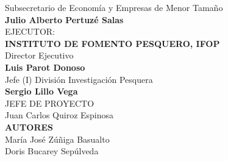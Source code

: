 \documentclass[12pt, oneside]{article} %
\begin{document}
\begin{titlepage}
\begin{minipage}{\textwidth}
\begin{flushright}
 \vspace*{5mm} 
  Subsecretario de Economía y Empresas de Menor Tamaño\\
 \textbf{Julio Alberto Pertuzé Salas} \\
 \vspace*{5mm} 
 EJECUTOR: \\ 
 \textbf{INSTITUTO DE FOMENTO PESQUERO, IFOP}\\
 \vspace*{4mm} 
 Director Ejecutivo   
 \\ \textbf{Luis Parot Donoso} \\
 \vspace*{4mm} 
 Jefe (I) División Investigación Pesquera   
 \\ \textbf{Sergio Lillo Vega} \\
 \vspace*{8mm} 
 \fontsize{9pt}{8pt}\selectfont
 JEFE DE PROYECTO   \\ Juan Carlos Quiroz Espinosa \\
 \vspace*{8mm} 
 \textbf{AUTORES}   \\ María José Zúñiga Basualto \\ Doris Bucarey Sepúlveda \end{flushright} 
\end{minipage}
\vfill
\end{titlepage}

\end{document}
